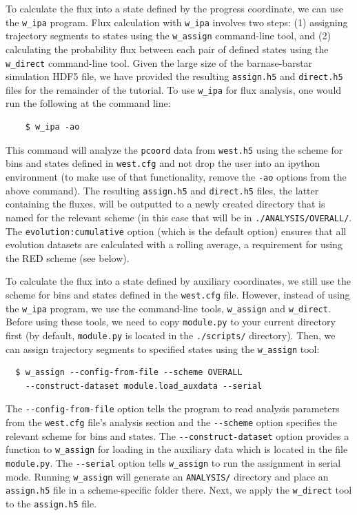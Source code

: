 To calculate the flux into a state defined by the progress coordinate, we can use the \verb|w_ipa| program. Flux calculation with \verb|w_ipa| involves two steps: (1) assigning trajectory segments to states using the \verb|w_assign| command-line tool, and (2) calculating the probability flux between each pair of defined states using the \verb|w_direct| command-line tool.
Given the large size of the barnase-barstar simulation HDF5 file, we have provided the resulting \verb|assign.h5| and \verb|direct.h5| files for the remainder of the tutorial.
To use \verb|w_ipa| for flux analysis, one would run the following at the command line:  

\begin{verbatim}
    $ w_ipa -ao
\end{verbatim}

This command will analyze the \verb|pcoord| data from \verb|west.h5| using the scheme for bins and states defined in \verb|west.cfg| and not drop the user into an ipython environment (to make use of that functionality, remove the \verb|-ao| options from the above command).
The resulting \verb|assign.h5| and \verb|direct.h5| files, the latter containing the fluxes, will be outputted to a newly created directory that is named for the relevant scheme (in this case that will be in \verb|./ANALYSIS/OVERALL/|.
The \verb|evolution:cumulative| option (which is the default option) ensures that all evolution datasets are calculated with a rolling average, a requirement for using the RED scheme (see below). 

To calculate the flux into a state defined by auxiliary coordinates, we still use the scheme for bins and states defined in the \verb|west.cfg| file.
However, instead of using the \verb|w_ipa| program, we use the command-line tools, \verb|w_assign| and \verb|w_direct|.
Before using these tools, we need to copy \verb|module.py| to your current directory first (by default, \verb|module.py| is located in the \verb|./scripts/| directory).
Then, we can assign trajectory segments to specified states using the \verb|w_assign| tool:

\begin{verbatim}
  $ w_assign --config-from-file --scheme OVERALL 
    --construct-dataset module.load_auxdata --serial
\end{verbatim}

The \verb|--config-from-file| option tells the program to read analysis parameters from the \verb|west.cfg| file’s analysis section and the \verb|--scheme| option specifies the relevant scheme for bins and states.
The \verb|--construct-dataset| option provides a function to \verb|w_assign| for loading in the auxiliary data which is located in the file \verb|module.py|.
The \verb|--serial| option tells \verb|w_assign| to run the assignment in serial mode.
Running \verb|w_assign| will generate an \verb|ANALYSIS/| directory and place an \verb|assign.h5| file in a scheme-specific folder there.
Next, we apply the \verb|w_direct| tool to the \verb|assign.h5| file.

